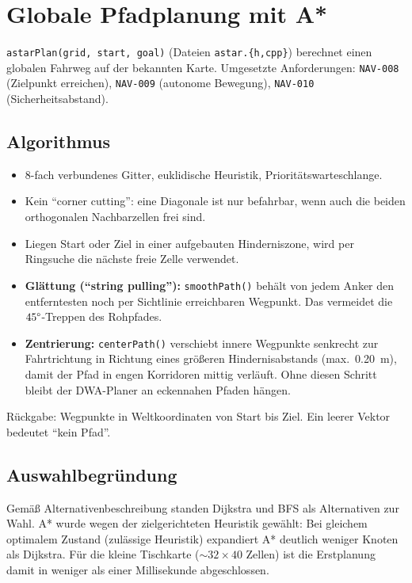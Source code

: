 \documentclass[
  a4paper,
  12pt,
  DIV=12,        %
  parskip=half,  %
  headings=small %
]{scrartcl}
\theoremstyle{definition}
\providecommand{\tightlist}{%
  \setlength{\itemsep}{0pt}\setlength{\parskip}{0pt}}
\theoremstyle{definition}
\begin{document}
\section{Globale Pfadplanung mit A*}\label{astar}

\texttt{astarPlan(grid, start, goal)} (Dateien \texttt{astar.\{h,cpp\}})
berechnet einen globalen Fahrweg auf der bekannten Karte. Umgesetzte
Anforderungen: \texttt{NAV-008} (Zielpunkt erreichen), \texttt{NAV-009}
(autonome Bewegung), \texttt{NAV-010} (Sicherheitsabstand).

\subsection{Algorithmus}\label{astar-algorithmus}

\begin{itemize}
\tightlist
\item
  8-fach verbundenes Gitter, euklidische Heuristik, Prioritäts\-warte\-schlange.
\item
  Kein \enquote{corner cutting}: eine Diagonale ist nur befahrbar, wenn
  auch die beiden orthogonalen Nachbarzellen frei sind.
\item
  Liegen Start oder Ziel in einer aufgebauten Hinderniszone, wird per
  Ringsuche die nächste freie Zelle verwendet.
\item
  \textbf{Glättung (\enquote{string pulling}):} \texttt{smoothPath()}
  behält von jedem Anker den entferntesten noch per Sichtlinie
  erreichbaren Wegpunkt. Das vermeidet die $45\degree$-Treppen des
  Rohpfades.
\item
  \textbf{Zentrierung:} \texttt{centerPath()} verschiebt innere
  Wegpunkte senkrecht zur Fahrtrichtung in Richtung eines größeren
  Hindernisabstands (max.\ \SI{0.20}{\meter}), damit der Pfad in engen
  Korridoren mittig verläuft. Ohne diesen Schritt bleibt der DWA-Planer
  an eckennahen Pfaden hängen.
\end{itemize}

Rückgabe: Wegpunkte in Weltkoordinaten von Start bis Ziel. Ein leerer
Vektor bedeutet \enquote{kein Pfad}.

\subsection{Auswahlbegründung}\label{astar-auswahl}

Gemäß Alternativenbeschreibung standen Dijkstra und BFS als Alternativen
zur Wahl. A* wurde wegen der zielgerichteten Heuristik gewählt: Bei
gleichem optimalem Zustand (zulässige Heuristik) expandiert A* deutlich
weniger Knoten als Dijkstra. Für die kleine Tischkarte
($\sim 32 \times 40$ Zellen) ist die Erstplanung damit in weniger als
einer Millisekunde abgeschlossen.
\end{document}
